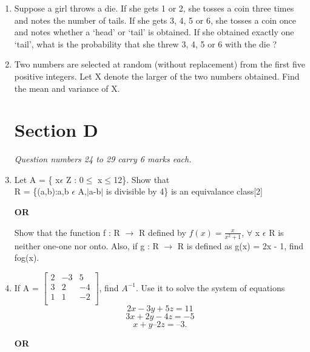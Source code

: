 \documentclass{exam}
\begin{document}
\begin{enumerate}
     \item Suppose a girl throws a die. If she gets 1 or 2, she tosses a coin three times and notes the number of tails. If she gets 3, 4, 5 or 6, she tosses a coin once and notes whether a ‘head’ or ‘tail’ is obtained. If she obtained exactly one ‘tail’, what is the probability that she threw 3, 4, 5 or 6 with the die ?
    
    \item Two numbers are selected at random (without replacement) from the first five positive integers. Let X denote the larger of the two numbers obtained. Find the mean and variance of X.
    
    \begin{center}
    \section*{Section D}
    \end{center}
    
    \begin{flushleft}
    \textit{Question numbers 24 to 29 carry 6 marks each.}
    \end{flushleft}
    
    \item Let A = \{ x$\epsilon$ Z : 0$\leq$ x$\leq$12\}. Show that\\
    R = \{(a,b):a,b $\epsilon$ A,$\lvert$a-b$\rvert$ is divisible by 4\} is an equivalance class[2]
    
    \begin{center}
    \textbf{OR}
    \end{center}
    
    Show that the function f : R $\rightarrow$ R defined by $f(x) = \frac{x}{x^{2} + 1}$, $\forall$ x $\epsilon$ R is neither one-one nor onto. Also, if g : R $\rightarrow$ R is defined as g(x) = 2x - 1, find fog(x).
    
    \item\noindent If A = 
    $\begin{bmatrix}
     2 & -3 & 5 \\
     3 & 2 & -4 \\
     1 & 1 & -2 \\
     \end{bmatrix} $,
     find $A^{-1}$. Use it to solve the system of equations 
     $$2x - 3y + 5z = 11$$
     $$3x + 2y -4z = -5$$
     $$x + y – 2z = – 3.$$
     
     \begin{center}
     \textbf{OR}
     \end{center}
     

\end{enumerate}
\end{document}
